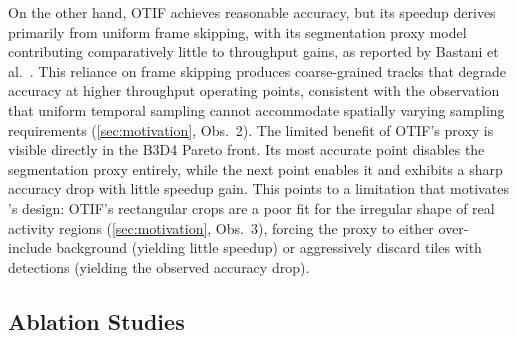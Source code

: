
% 
% 

On the other hand, OTIF achieves reasonable accuracy,
but its speedup derives primarily from uniform frame skipping,
with its segmentation proxy model contributing comparatively little to throughput gains,
as reported by Bastani et al.~\cite{bastani2022otif}.
This reliance on frame skipping produces coarse-grained tracks that degrade accuracy at higher throughput operating points,
consistent with the observation that uniform temporal sampling cannot accommodate spatially varying sampling requirements (\autoref{sec:motivation}, Obs.~2).
The limited benefit of OTIF's proxy is visible directly in the B3D4 Pareto front.
Its most accurate point disables the segmentation proxy entirely,
while the next point enables it and exhibits a sharp accuracy drop with little speedup gain.
This points to a limitation that motivates \sys{}'s design:
OTIF's rectangular crops are a poor fit for the irregular shape of real activity regions (\autoref{sec:motivation}, Obs.~3),
forcing the proxy to either over-include background (yielding little speedup) or aggressively discard tiles with detections (yielding the observed accuracy drop).



\subsection{Ablation Studies}


